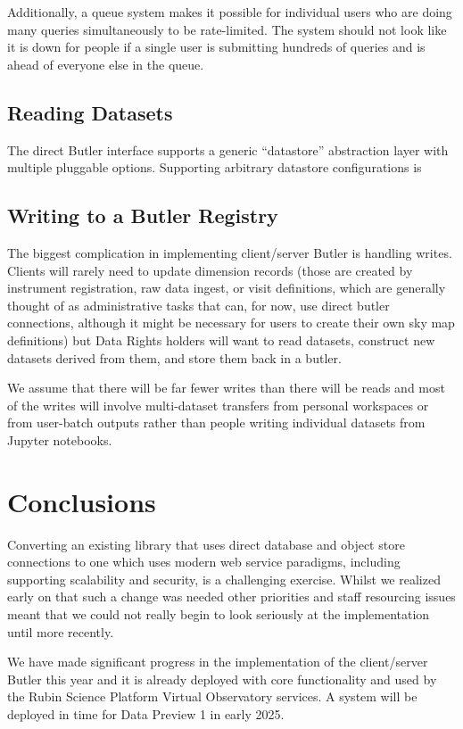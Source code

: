 Additionally, a queue system makes it possible for individual users who are doing many queries simultaneously to be rate-limited.
The system should not look like it is down for people if a single user is submitting hundreds of queries and is ahead of everyone else in the queue.

\subsection{Reading Datasets}

The direct Butler interface supports a generic ``datastore'' abstraction layer with multiple pluggable options.
Supporting arbitrary datastore configurations is

\subsection{Writing to a Butler Registry}

The biggest complication in implementing client/server Butler is handling writes.
Clients will rarely need to update dimension records (those are created by instrument registration, raw data ingest, or visit definitions, which are generally thought of as administrative tasks that can, for now, use direct butler connections, although it might be necessary for users to create their own sky map definitions) but Data Rights holders will want to read datasets, construct new datasets derived from them, and store them back in a butler.

We assume that there will be far fewer writes than there will be reads and most of the writes will involve multi-dataset transfers from personal workspaces or from user-batch outputs \cite{DMTN-223} rather than people writing individual datasets from Jupyter notebooks.

\section{Conclusions}

Converting an existing library that uses direct database and object store connections to one which uses modern web service paradigms, including supporting scalability and security, is a challenging exercise.
Whilst we realized early on that such a change was needed \cite{DMTN-169,DMTN-176} other priorities and staff resourcing issues meant that we could not really begin to look seriously at the implementation until more recently. \cite{DMTN-282,DMTN-283}

We have made significant progress in the implementation of the client/server Butler this year and it is already deployed with core functionality and used by the Rubin Science Platform Virtual Observatory services. \cite{DMTN-208}
A system will be deployed in time for Data Preview 1 in early 2025. \cite{RTN-011}
